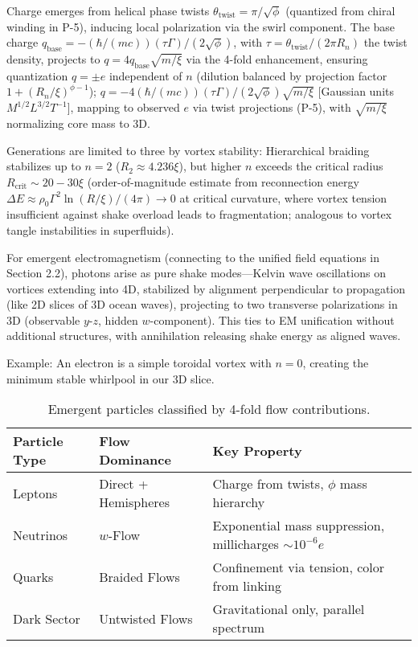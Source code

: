 Charge emerges from helical phase twists $\theta_{\text{twist}} = \pi / \sqrt{\phi}$ (quantized from chiral winding in P-5), inducing local polarization via the swirl component. The base charge $q_{\text{base}} = - (\hbar / (m c)) (\tau \Gamma) / (2 \sqrt{\phi})$, with $\tau = \theta_{\text{twist}} / (2 \pi R_n)$ the twist density, projects to $q = 4 q_{\text{base}} \sqrt{m / \xi}$ via the 4-fold enhancement, ensuring quantization $q = \pm e$ independent of $n$ (dilution balanced by projection factor $1 + (R_n / \xi)^{\phi - 1}$); $q = -4 (\hbar / (m c)) (\tau \Gamma) / (2 \sqrt{\phi}) \sqrt{m / \xi}$ [Gaussian units $M^{1/2} L^{3/2} T^{-1}$], mapping to observed $e$ via twist projections (P-5), with $\sqrt{m / \xi}$ normalizing core mass to 3D.

Generations are limited to three by vortex stability: Hierarchical braiding stabilizes up to $n=2$ ($R_2 \approx 4.236 \xi$), but higher $n$ exceeds the critical radius $R_{\text{crit}} \sim 20-30 \xi$ (order-of-magnitude estimate from reconnection energy $\Delta E \approx \rho_0 \Gamma^2 \ln(R / \xi) / (4\pi) \to 0$ at critical curvature, where vortex tension insufficient against shake overload leads to fragmentation; analogous to vortex tangle instabilities in superfluids).

For emergent electromagnetism (connecting to the unified field equations in Section 2.2), photons arise as pure shake modes---Kelvin wave oscillations on vortices extending into 4D, stabilized by alignment perpendicular to propagation (like 2D slices of 3D ocean waves), projecting to two transverse polarizations in 3D (observable $y$-$z$, hidden $w$-component). This ties to EM unification without additional structures, with annihilation releasing shake energy as aligned waves.

Example: An electron is a simple toroidal vortex with $n=0$, creating the minimum stable whirlpool in our 3D slice.

\begin{table}[h]
\centering
\begin{tabular}{|l|l|l|}
\hline
Particle Type & Flow Dominance & Key Property \\
\hline
Leptons & Direct + Hemispheres & Charge from twists, $\phi$ mass hierarchy \\
Neutrinos & $w$-Flow & Exponential mass suppression, millicharges $\sim 10^{-6} e$ \\
Quarks & Braided Flows & Confinement via tension, color from linking \\
Dark Sector & Untwisted Flows & Gravitational only, parallel spectrum \\
\hline
\end{tabular}
\caption{Emergent particles classified by 4-fold flow contributions.}
\label{tab:particles}
\end{table}

